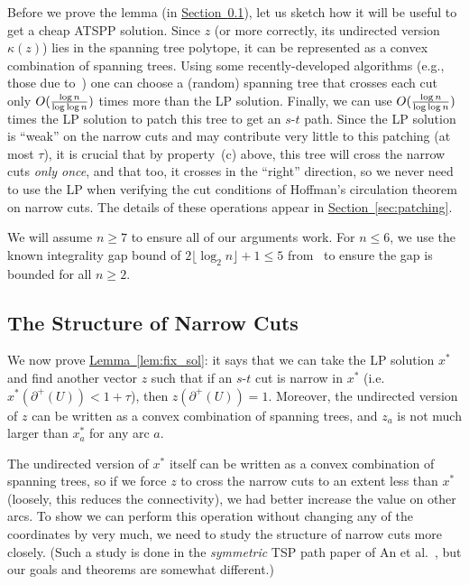 \documentclass[11pt]{article}
\newcommand{\lref}[2][]{\hyperref[#2]{#1~\ref*{#2}}}
\theoremstyle{definition}
\newcommand{\factor}{\ensuremath{O(\smash{\frac{\log n}{\log\log n}})}}
\begin{document}
Before we prove the lemma (in \lref[Section]{sec:proof-of-lem}), let us
sketch how it will be useful to get a cheap ATSPP solution. Since $z$ (or more
correctly, its undirected version $\kappa(z)$) lies in the spanning tree
polytope, it can be represented as a convex combination of spanning
trees.  Using some recently-developed algorithms (e.g., those due
to~\cite{AGMSS,CVZ10}) one can choose a (random) spanning tree that crosses
each cut only $\factor$ times more than the LP solution. Finally, we can
use $\factor$ times the LP solution to patch this tree to get an $s$-$t$
path. Since the LP solution is ``weak'' on the narrow cuts and may
contribute very little to this patching (at most $\tau$), it is crucial
that by property~(c) above, this tree will cross the narrow cuts
\emph{only once}, and that too, it crosses in the ``right'' direction,
so we never need to use the LP when verifying the cut conditions of
Hoffman's circulation theorem on narrow cuts. The details of these
operations appear in \lref[Section]{sec:patching}.

We will assume $n \geq 7$ to ensure all of our arguments work. For $n \leq 6$,
we use the known integrality gap bound of $2 \lfloor \log_2 n \rfloor + 1 \leq 5$
from~\cite{FSS10} to ensure the gap is bounded for all $n \geq 2$.

\subsection{The Structure of Narrow Cuts}
\label{sec:proof-of-lem}

We now prove \lref[Lemma]{lem:fix_sol}: it says that we can take the LP
solution $x^*$ and find another vector $z$ such that if an $s$-$t$ cut is
narrow in $x^*$ (i.e. $x^*(\partial^+(U)) < 1 + \tau$), then $z(\partial^+(U)) = 1$. Moreover,
the undirected version of $z$ can be written as a convex combination of
spanning trees, and $z_a$ is not much larger than $x^*_a$ for any arc $a$.

The undirected version of $x^*$ itself can be written as a
convex combination of spanning trees, so if we force $z$ to cross the
narrow cuts to an extent less than $x^*$ (loosely, this reduces the
connectivity), we had better increase the value on other arcs. To show we
can perform this operation without changing any of the coordinates by
very much, we need to study the structure of narrow cuts more closely.
(Such a study is done in the \emph{symmetric} TSP path paper of An et
al.~\cite{AKS12}, but our goals and theorems are somewhat different.)
\end{document}
